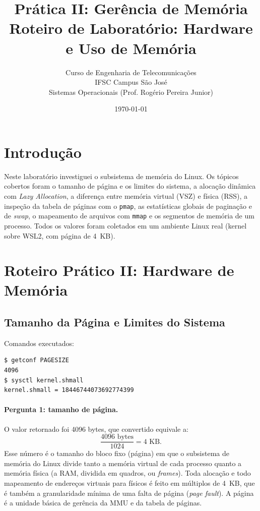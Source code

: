 \documentclass[11pt,a4paper]{article}
\title{\textbf{Prática II: Gerência de Memória} \\ \large Roteiro de Laboratório: Hardware e Uso de Memória}
\author{Curso de Engenharia de Telecomunicações \\ IFSC Campus São José \\ Sistemas Operacionais (Prof. Rogério Pereira Junior)}
\date{\today}
\begin{document}
\maketitle

\section*{Introdução}
Neste laboratório investiguei o subsistema de memória do Linux. Os tópicos cobertos foram o tamanho
de página e os limites do sistema, a alocação dinâmica com \emph{Lazy Allocation}, a diferença entre
memória virtual (VSZ) e física (RSS), a inspeção da tabela de páginas com o \texttt{pmap}, as
estatísticas globais de paginação e de \emph{swap}, o mapeamento de arquivos com \texttt{mmap} e os
segmentos de memória de um processo. Todos os valores foram coletados em um ambiente Linux real
(kernel sobre WSL2, com página de 4~KB).

\tableofcontents
\vspace{1em}

\section{Roteiro Prático II: Hardware de Memória}

\subsection{Tamanho da Página e Limites do Sistema}

Comandos executados:
\begin{lstlisting}[style=bashstyle]
$ getconf PAGESIZE
4096
$ sysctl kernel.shmall
kernel.shmall = 18446744073692774399
\end{lstlisting}

\paragraph{Pergunta 1: tamanho de página.}
O valor retornado foi 4096 bytes, que convertido equivale a:
\[
\frac{4096 \text{ bytes}}{1024} = 4 \text{ KB}.
\]
Esse número é o tamanho do bloco fixo (página) em que o subsistema de memória do Linux divide tanto
a memória virtual de cada processo quanto a memória física (a RAM, dividida em quadros, ou
\emph{frames}). Toda alocação e todo mapeamento de endereços virtuais para físicos é feito em
múltiplos de 4~KB, que é também a granularidade mínima de uma falta de página (\emph{page fault}).
A página é a unidade básica de gerência da MMU e da tabela de páginas.
\end{document}
